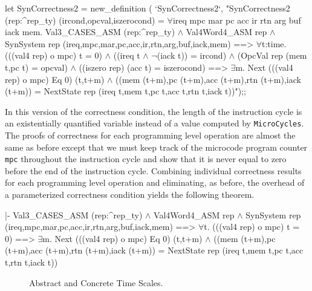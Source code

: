\begintt
let SynCorrectness2 = new_definition (
  `SynCorrectness2`,
  "SynCorrectness2 (rep:^rep_ty) (ircond,opcval,iszerocond) =
    \(\forall\)ireq mpc mar pc acc ir rtn arg buf iack mem.
      Val3_CASES_ASM (rep:^rep_ty) \(\wedge\)
      Val4Word4_ASM rep \(\wedge\)
      SynSystem rep (ireq,mpc,mar,pc,acc,ir,rtn,arg,buf,iack,mem)
      ==>
      \(\forall\)t:time.
        (((val4 rep) o mpc) t = 0) \(\wedge\)
        ((ireq t \(\wedge\) \(\neg\)(iack t)) = ircond) \(\wedge\)
        (OpcVal rep (mem t,pc t) = opcval) \(\wedge\)
        ((iszero rep) (acc t) = iszerocond)
        ==>
        \(\exists\)m.
          Next (((val4 rep) o mpc) Eq 0) (t,t+m) \(\wedge\)
          ((mem (t+m),pc (t+m),acc (t+m),rtn (t+m),iack (t+m)) =
           NextState rep (ireq t,mem t,pc t,acc t,rtn t,iack t))");;
\endtt

In this version of the correctness condition,
the length of the instruction cycle
is an existentially quantified
variable instead of a value computed by \verb"MicroCycles".
The proofs of correctness for each programming level operation
are almost the same as before
except that we must keep track of the
microcode program counter \verb"mpc" throughout the instruction cycle
and show that it
is never equal to zero before the end of the instruction cycle.
Combining individual correctness results for each programming level
operation and eliminating, as before, the overhead of a parameterized
correctness condition yields the following theorem.

\begintt
|- Val3_CASES_ASM (rep:^rep_ty) \(\wedge\)
   Val4Word4_ASM rep \(\wedge\)
   SynSystem rep (ireq,mpc,mar,pc,acc,ir,rtn,arg,buf,iack,mem)
   ==>
   \(\forall\)t.
     (((val4 rep) o mpc) t = 0)
     ==>
     \(\exists\)m.
       Next (((val4 rep) o mpc) Eq 0) (t,t+m) \(\wedge\)
       ((mem (t+m),pc (t+m),acc (t+m),rtn (t+m),iack (t+m)) =
        NextState rep (ireq t,mem t,pc t,acc t,rtn t,iack t))
\endtt

\begin{figure}
\begin{center}


\caption{Abstract and Concrete Time Scales.}
\label{fig-temp}
\end{center}
\end{figure}

